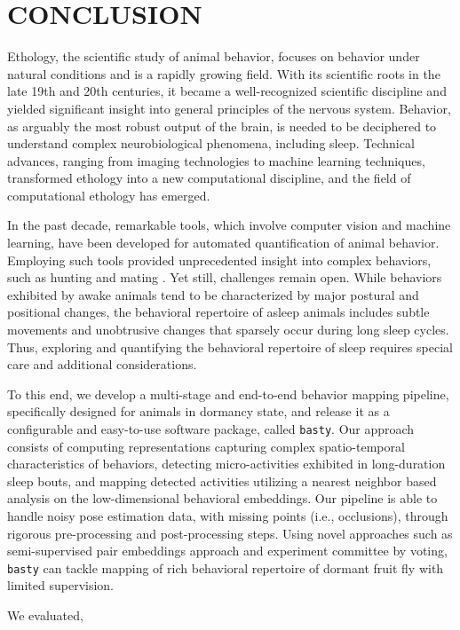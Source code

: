 \setlength{\parindent}{0pt}
\chapter{\bf CONCLUSION}\label{chapter:conclusion}

Ethology, the scientific study of animal behavior, focuses on behavior under natural conditions and is a rapidly growing field.
With its scientific roots in the late 19th and 20th centuries, it became a well-recognized scientific discipline and yielded significant insight into general principles of the nervous system.
Behavior, as arguably the most robust output of the brain, is needed to be deciphered to understand complex neurobiological phenomena, including sleep.
Technical advances, ranging from imaging technologies to machine learning techniques, transformed ethology into a new computational discipline, and the field of computational ethology has emerged.

In the past decade, remarkable tools, which involve computer vision and machine learning, have been developed for automated quantification of animal behavior.
Employing such tools provided unprecedented insight into complex behaviors, such as hunting and mating \citep{mearns_deconstructing_2020, janisch_deciphering_2021}.
Yet still, challenges remain open.
While behaviors exhibited by awake animals tend to be characterized by major postural and positional changes, the behavioral repertoire of asleep animals includes subtle movements and unobtrusive changes that sparsely occur during long sleep cycles.
Thus, exploring and quantifying the behavioral repertoire of sleep requires special care and additional considerations.

To this end, we develop a multi-stage and end-to-end behavior mapping pipeline, specifically designed for animals in dormancy state, and release it as a configurable and easy-to-use software package, called \texttt{basty}.
Our approach consists of computing representations capturing complex spatio-temporal characteristics of behaviors, detecting micro-activities exhibited in long-duration sleep bouts, and mapping detected activities utilizing a nearest neighbor based analysis on the low-dimensional behavioral embeddings.
Our pipeline is able to handle noisy pose estimation data, with missing points (i.e., occlusions), through rigorous pre-processing and post-processing steps.
Using novel approaches such as semi-supervised pair embeddings approach and experiment committee by voting, \texttt{basty} can tackle mapping of rich behavioral repertoire of dormant fruit fly with limited supervision.

We evaluated,



